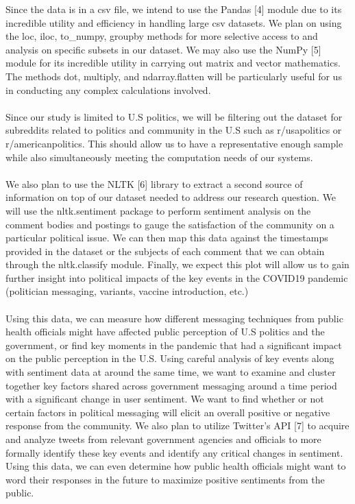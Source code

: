 \documentclass[fontsize=11pt]{article}
\begin{document}
Since the data is in a csv file, we intend to use the Pandas [4] module due to its incredible utility and efficiency in handling large csv datasets. We plan on using the loc, iloc, to\_numpy, groupby methods for more selective access to and analysis on specific subsets in our dataset. We may also use the NumPy [5] module for its incredible utility in carrying out matrix and vector mathematics. The methods dot, multiply, and ndarray.flatten will be particularly useful for us in conducting any complex calculations involved.
\\\\
Since our study is limited to U.S politics, we will be filtering out the dataset for subreddits related to politics and community in the U.S such as r/usapolitics or r/americanpolitics. This should allow us to have a representative enough sample while also simultaneously meeting the computation needs of our systems.
\\\\
We also plan to use the NLTK [6] library to extract a second source of information on top of our dataset needed to address our research question. We will use the nltk.sentiment package to perform sentiment analysis on the comment bodies and postings to gauge the satisfaction of the community on a particular political issue. We can then map this data against the timestamps provided in the dataset or the subjects of each comment that we can obtain through the nltk.classify module. Finally, we expect this plot will allow us to gain further insight into political impacts of the key events in the COVID19 pandemic (politician messaging, variants, vaccine introduction, etc.)
\\\\
Using this data, we can measure how different messaging techniques from public health officials might have affected public perception of U.S politics and the government, or find key moments in the pandemic that had a significant impact on the public perception in the U.S. Using careful analysis of key events along with sentiment data at around the same time, we want to examine and cluster together key factors shared across government messaging around a time period with a significant change in user sentiment. We want to find whether or not certain factors in political messaging will elicit an overall positive or negative response from the community. We also plan to utilize Twitter’s API [7] to acquire and analyze tweets from relevant government agencies and officials to more formally identify these key events and identify any critical changes in sentiment. Using this data, we can even determine how public health officials might want to word their responses in the future to maximize positive sentiments from the public.
\end{document}

